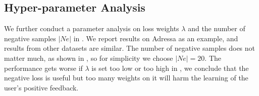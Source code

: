 \subsection{Hyper-parameter Analysis}
We further conduct a parameter analysis on loss weights $\lambda$ and the number of negative samples $|Ne|$ 
in . We report results on Adressa as an example, and results from other datasets are similar. 
The number of negative samples does not matter much, as shown in , 
so for simplicity we choose $|Ne|=20$. The performance gets worse if $\lambda$ is set too low or too 
high in , we conclude that the negative loss is useful but too many weights on it will harm the learning of the user's positive feedback.

